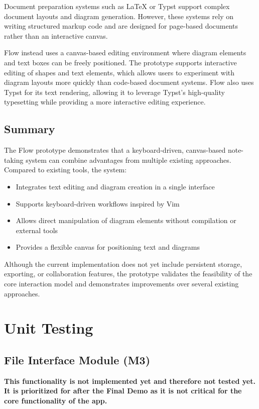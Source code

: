 \documentclass[12pt, titlepage]{article}
\begin{document}
Document preparation systems such as \LaTeX{} or Typst support complex document layouts and diagram
generation. However, these systems rely on writing structured markup code and are designed
for page-based documents rather than an interactive canvas.

\vspace{1em}

Flow instead uses a canvas-based editing environment where diagram elements and text boxes can be
freely positioned. The prototype supports interactive editing of shapes and text elements, which allows
users to experiment with diagram layouts more quickly than code-based document systems. Flow also
uses Typst for its text rendering, allowing it to leverage Typst's high-quality typesetting while 
providing a more interactive editing experience.

\subsection{Summary}

The Flow prototype demonstrates that a keyboard-driven, canvas-based note-taking system can combine
advantages from multiple existing approaches. Compared to existing tools, the system:

\begin{itemize}
\item Integrates text editing and diagram creation in a single interface
\item Supports keyboard-driven workflows inspired by Vim
\item Allows direct manipulation of diagram elements without compilation or external tools
\item Provides a flexible canvas for positioning text and diagrams
\end{itemize}

Although the current implementation does not yet include persistent storage, exporting, or collaboration
features, the prototype validates the feasibility of the core interaction model and demonstrates improvements
over several existing approaches.


\section{Unit Testing}

\subsection{File Interface Module (M3)}
\textbf{This functionality is not implemented yet and therefore not tested yet. It is prioritized for 
after the Final Demo as it is not critical for the core functionality of the app.}
\end{document}
